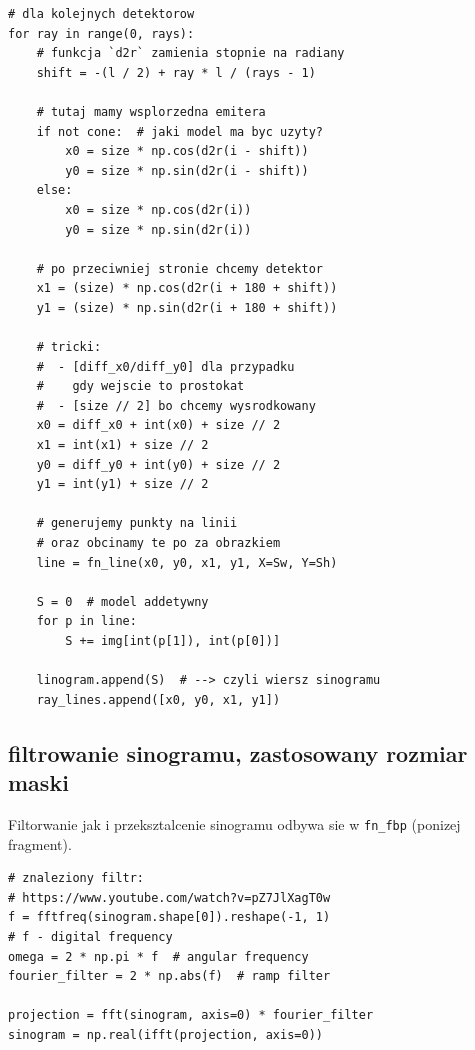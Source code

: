 \documentclass{bmvc2k}
\begin{document}
\begin{verbatim}
# dla kolejnych detektorow
for ray in range(0, rays):
    # funkcja `d2r` zamienia stopnie na radiany
    shift = -(l / 2) + ray * l / (rays - 1)

    # tutaj mamy wsplorzedna emitera
    if not cone:  # jaki model ma byc uzyty?
        x0 = size * np.cos(d2r(i - shift))
        y0 = size * np.sin(d2r(i - shift))
    else:
        x0 = size * np.cos(d2r(i))
        y0 = size * np.sin(d2r(i))

    # po przeciwniej stronie chcemy detektor
    x1 = (size) * np.cos(d2r(i + 180 + shift))
    y1 = (size) * np.sin(d2r(i + 180 + shift))

    # tricki:
    #  - [diff_x0/diff_y0] dla przypadku
    #    gdy wejscie to prostokat
    #  - [size // 2] bo chcemy wysrodkowany
    x0 = diff_x0 + int(x0) + size // 2
    x1 = int(x1) + size // 2
    y0 = diff_y0 + int(y0) + size // 2
    y1 = int(y1) + size // 2

    # generujemy punkty na linii
    # oraz obcinamy te po za obrazkiem
    line = fn_line(x0, y0, x1, y1, X=Sw, Y=Sh)

    S = 0  # model addetywny
    for p in line:
        S += img[int(p[1]), int(p[0])]

    linogram.append(S)  # --> czyli wiersz sinogramu
    ray_lines.append([x0, y0, x1, y1])
\end{verbatim}

\subsection{filtrowanie sinogramu, zastosowany rozmiar maski}

Filtorwanie jak i przeksztalcenie sinogramu odbywa sie w {\tt fn\_fbp} (ponizej
fragment).

\begin{verbatim}
# znaleziony filtr:
# https://www.youtube.com/watch?v=pZ7JlXagT0w
f = fftfreq(sinogram.shape[0]).reshape(-1, 1)
# f - digital frequency
omega = 2 * np.pi * f  # angular frequency
fourier_filter = 2 * np.abs(f)  # ramp filter

projection = fft(sinogram, axis=0) * fourier_filter
sinogram = np.real(ifft(projection, axis=0))
\end{verbatim}
\end{document}
